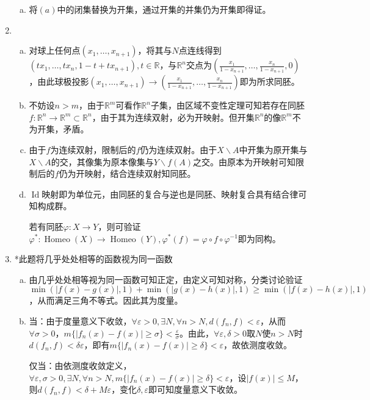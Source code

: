 \documentclass[a4paper,UTF8,fontset=windows]{ctexart}
\DeclareMathOperator{\Homeo}{Homeo}
\DeclareMathOperator{\Id}{Id}
\begin{document}
\begin{enumerate}[(1)]
\begin{enumerate}[(a)]
    \item
    将$(a)$中的闭集替换为开集，通过开集的并集仍为开集即得证。
    \end{enumerate}
    
    \item
    \begin{enumerate}[(a)]
    \item
    对球上任何点$(x_1,\dots,x_{n+1})$，将其与$N$点连线得到$(tx_1,\dots,tx_n,1-t+tx_{n+1}),t\in\mathbb{R}$，与$\mathbb{R}^n$交点为$(\frac{x_1}{1-x_{n+1}},\dots,\frac{x_n}{1-x_{n+1}},0)$，由此球极投影$(x_1,\dots,x_{n+1})\to(\frac{x_1}{1-x_{n+1}},\dots,\frac{x_n}{1-x_{n+1}})$即为所求同胚。
    
    \item
    不妨设$n>m$，由于$\mathbb{R}^m$可看作$\mathbb{R}^n$子集，由区域不变性定理可知若存在同胚$f:\mathbb{R}^n\to\mathbb{R}^m\subset\mathbb{R}^n$，由于其为连续双射，必为开映射。但开集$\mathbb{R}^n$的像$\mathbb{R}^m$不为开集，矛盾。
    
    \item
    由于$f$为连续双射，限制后的$f$仍为连续双射。由于$X\backslash A$中开集为原开集与$X\backslash A$的交，其像集为原本像集与$Y\backslash f(A)$之交。由原本为开映射可知限制后的$f$仍为开映射，结合连续双射知同胚。
    
    \item
    $\Id$映射即为单位元，由同胚的复合与逆也是同胚、映射复合具有结合律可知构成群。
    
    若有同胚$\varphi:X\to Y$，则可验证$\varphi^*:\Homeo(X)\to\Homeo(Y),\varphi^*(f)=\varphi\circ f\circ\varphi^{-1}$即为同构。
    \end{enumerate}
    
    \item
    *此题将几乎处处相等的函数视为同一函数
    \begin{enumerate}[(a)]
    \item
    由几乎处处相等视为同一函数可知正定，由定义可知对称，分类讨论验证$\min(|f(x)-g(x)|,1)+\min(|g(x)-h(x)|,1)\ge\min(|f(x)-h(x)|,1)$，从而满足三角不等式。因此其为度量。
    
    \item
    当：由于度量意义下收敛，$\forall\varepsilon>0,\exists N,\forall n>N,d(f_n,f)<\varepsilon$，从而$\forall\sigma>0$，$m\{|f_n(x)-f(x)|\ge\sigma\}<\frac{\varepsilon}{\sigma}$。由此，$\forall\varepsilon,\delta>0$取$N$使$n>N$时$d(f_n,f)<\delta\varepsilon$，即有$m\{|f_n(x)-f(x)|\ge\delta\}<\varepsilon$，故依测度收敛。
    
    仅当：由依测度收敛定义，$\forall\varepsilon,\sigma>0,\exists N,\forall n>N,m\{|f_n(x)-f(x)|\ge\delta\}<\varepsilon$，设$|f(x)|\le M$，则$d(f_n,f)<\delta+M\varepsilon$，变化$\delta,\varepsilon$即可知度量意义下收敛。
    

\end{enumerate}
\end{enumerate}
\end{document}

